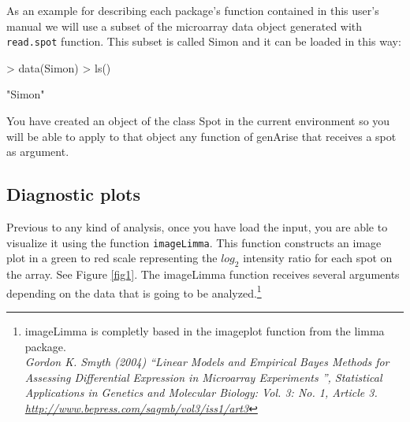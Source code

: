 \documentclass[12pt]{article}
\begin{document}
As an example for describing each package's function contained in this user's manual we will use a subset of the microarray data object generated with \texttt{read.spot} function. This subset is called Simon and it can be loaded in this way:

\begin{Schunk}
\begin{Sinput}
> data(Simon)
> ls()
\end{Sinput}
\begin{Soutput}
[1] "Simon"
\end{Soutput}
\end{Schunk}

\begin{Soutput}
You have created an object of the class Spot in the current
environment so you will be able to apply to that object any 
function of genArise that receives a spot as argument.
\end{Soutput}

\subsection{Diagnostic plots}
Previous to any kind of analysis, once you have load the input, you are able to visualize it using the function \texttt{imageLimma}. This function constructs an image plot in a green to red scale representing the $log_2$ intensity ratio for each spot on the array. See Figure \ref{fig1}. The imageLimma function receives several arguments depending on the data that is going to be analyzed.\footnote{imageLimma is completly based in the imageplot function from the limma package.\\ \textit{Gordon K. Smyth (2004) \textquotedblleft Linear Models and Empirical Bayes Methods for Assessing Differential Expression in Microarray Experiments \textquotedblright, Statistical Applications in Genetics and Molecular Biology: Vol. 3: No. 1, Article 3. \url{http://www.bepress.com/sagmb/vol3/iss1/art3}}} \\
\end{document}
